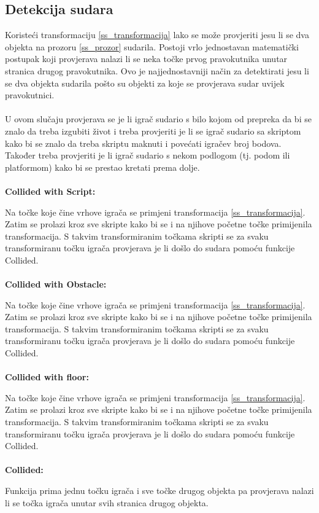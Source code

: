 \documentclass{mathos}
\begin{document}
\subsection{Detekcija sudara}
Koristeći transformaciju  \ref{ss_transformacija} lako se može provjeriti jesu li se dva objekta na prozoru \ref{ss_prozor} sudarila. Postoji vrlo jednostavan matematički postupak
koji provjerava nalazi li se neka točke prvog pravokutnika unutar stranica drugog pravokutnika. Ovo je najjednostavniji način za detektirati jesu li se dva objekta sudarila pošto
su objekti za koje se provjerava sudar uvijek pravokutnici.
\\ \\
U ovom slučaju provjerava se je li igrač sudario s bilo kojom od prepreka da bi se znalo da treba izgubiti život i
treba provjeriti je li se igrač sudario sa skriptom kako bi se znalo da treba skriptu maknuti i povećati igračev broj bodova. Također treba provjeriti je li igrač sudario s
nekom podlogom (tj. podom ili platformom) kako bi se prestao kretati prema dolje.
\\ \\
\textbf{Collided with Script: }

Na točke koje čine vrhove igrača se primjeni transformacija  \ref{ss_transformacija}. Zatim se prolazi kroz sve skripte kako bi se i na njihove početne točke primijenila transformacija.
S takvim transformiranim točkama skripti se za svaku transformiranu točku igrača provjerava je li došlo do sudara pomoću funkcije Collided.
\\ \\
\textbf{Collided with Obstacle: }

Na točke koje čine vrhove igrača se primjeni transformacija  \ref{ss_transformacija}. Zatim se prolazi kroz sve skripte kako bi se i na njihove početne točke primijenila transformacija.
S takvim transformiranim točkama skripti se za svaku transformiranu točku igrača provjerava je li došlo do sudara pomoću funkcije Collided.
\\ \\
\textbf{Collided with floor: }

Na točke koje čine vrhove igrača se primjeni transformacija  \ref{ss_transformacija}. Zatim se prolazi kroz sve skripte kako bi se i na njihove početne točke primijenila transformacija.
S takvim transformiranim točkama skripti se za svaku transformiranu točku igrača provjerava je li došlo do sudara pomoću funkcije Collided.
\\ \\
\textbf{Collided: }

Funkcija prima jednu točku igrača i sve točke drugog objekta pa provjerava nalazi li se točka igrača unutar svih stranica drugog objekta.
\end{document}
